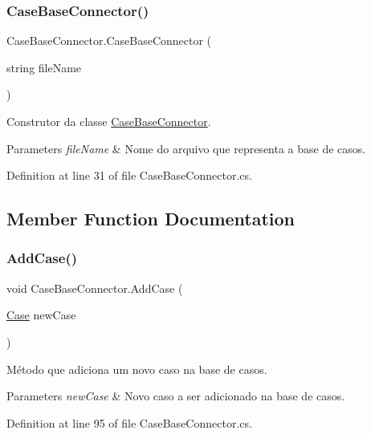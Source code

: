 \subsubsection{\texorpdfstring{Case\+Base\+Connector()}{CaseBaseConnector()}}
{\footnotesize\ttfamily Case\+Base\+Connector.\+Case\+Base\+Connector (\begin{DoxyParamCaption}\item[{string}]{file\+Name }\end{DoxyParamCaption})}



Construtor da classe \hyperlink{class_case_base_connector}{Case\+Base\+Connector}. 


\begin{DoxyParams}{Parameters}
{\em file\+Name} & Nome do arquivo que representa a base de casos.\\
\hline
\end{DoxyParams}


Definition at line 31 of file Case\+Base\+Connector.\+cs.



\subsection{Member Function Documentation}
\hypertarget{class_case_base_connector_abfb6f1dae5b06827667d5f033736f7a0}{}\label{class_case_base_connector_abfb6f1dae5b06827667d5f033736f7a0} 
\subsubsection{\texorpdfstring{Add\+Case()}{AddCase()}}
{\footnotesize\ttfamily void Case\+Base\+Connector.\+Add\+Case (\begin{DoxyParamCaption}\item[{\hyperlink{class_case}{Case}}]{new\+Case }\end{DoxyParamCaption})}



Método que adiciona um novo caso na base de casos. 


\begin{DoxyParams}{Parameters}
{\em new\+Case} & Novo caso a ser adicionado na base de casos.\\
\hline
\end{DoxyParams}


Definition at line 95 of file Case\+Base\+Connector.\+cs.

